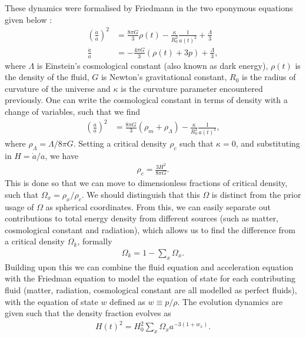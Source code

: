 \documentclass[titlesmallcaps, examinerscopy, copyrightpage]{uqthesis}
\begin{document}
These dynamics were formalised by Friedmann in the two eponymous equations given below \citep{RydenPartridge2004}:
\begin{align}
\left(\frac{\dot{a}}{a}\right)^2 &= \frac{8\pi G}{3} \rho(t) - \frac{\kappa}{R_0^2} \frac{1}{a(t)^2} + \frac{\Lambda}{3} \\
\frac{\ddot{a}}{a} &= - \frac{4\pi G}{3} (\rho(t) + 3p) + \frac{\Lambda}{3},
\end{align}
where $\Lambda$ is Einstein's cosmological constant (also known as dark energy), $\rho(t)$ is the density of the fluid, $G$ is Newton's gravitational constant, $R_0$ is the radius of curvature of the universe and $\kappa$ is the curvature parameter encountered previously. One can write the cosmological constant in terms of density with a change of variables, such that we find
\begin{align}
\left(\frac{\dot{a}}{a}\right)^2 &= \frac{8\pi G}{3} (\rho_m + \rho_\Lambda) - \frac{\kappa}{R_0^2} \frac{1}{a(t)^2},
\end{align}
where $\rho_\Lambda = \Lambda / 8\pi G$. Setting a critical density $\rho_c$ such that $\kappa = 0$, and substituting in $H = \dot{a}/a$, we have 
\begin{align}
\rho_c = \frac{3H^2}{8\pi G}.
\end{align}
This is done so that we can move to dimensionless fractions of critical density, such that $\Omega_x = \rho_x / \rho_c$. We should distinguish that this $\Omega$ is distinct from the prior usage of $\Omega$ as spherical coordinates. From this, we can easily separate out contributions to total energy density from different sources (such as matter, cosmological constant and radiation), which allows us to find the difference from a critical density $\Omega_k$, formally
\begin{align} \label{eq:omk}
\Omega_k = 1 - \sum_x \Omega_x.
\end{align}
Building upon this we can combine the fluid equation and acceleration equation with the Friedman equation \citep[see][Ch 4.2, 4.3, for full derivation]{RydenPartridge2004} to model the equation of state for each contributing fluid (matter, radiation, cosmological constant are all modelled as perfect fluids), with the equation of state $w$ defined as $w \equiv p/\rho$. The evolution dynamics are given such that the density fraction evolves as
\begin{align} \label{eq:hz}
H(t)^2 = H_0^2 \sum_x \Omega_x a^{-3(1+w_x)}.
\end{align}
\end{document}

